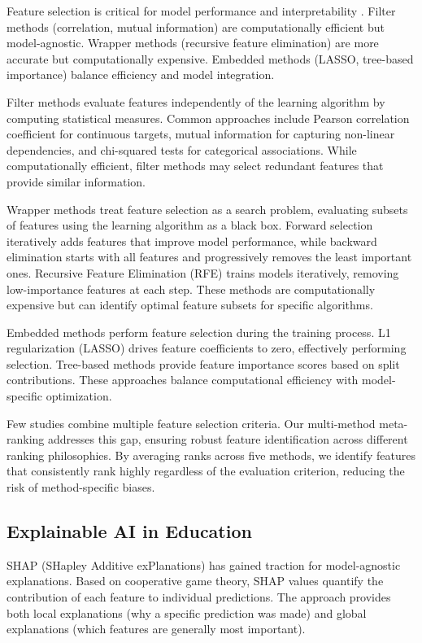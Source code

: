 \documentclass[journal]{IEEEtran}
\begin{document}
Feature selection is critical for model performance and interpretability \cite{guyon2003introduction}. Filter methods (correlation, mutual information) are computationally efficient but model-agnostic. Wrapper methods (recursive feature elimination) are more accurate but computationally expensive. Embedded methods (LASSO, tree-based importance) balance efficiency and model integration.

Filter methods evaluate features independently of the learning algorithm by computing statistical measures. Common approaches include Pearson correlation coefficient for continuous targets, mutual information for capturing non-linear dependencies, and chi-squared tests for categorical associations. While computationally efficient, filter methods may select redundant features that provide similar information.

Wrapper methods treat feature selection as a search problem, evaluating subsets of features using the learning algorithm as a black box. Forward selection iteratively adds features that improve model performance, while backward elimination starts with all features and progressively removes the least important ones. Recursive Feature Elimination (RFE) trains models iteratively, removing low-importance features at each step. These methods are computationally expensive but can identify optimal feature subsets for specific algorithms.

Embedded methods perform feature selection during the training process. L1 regularization (LASSO) drives feature coefficients to zero, effectively performing selection. Tree-based methods provide feature importance scores based on split contributions. These approaches balance computational efficiency with model-specific optimization.

Few studies combine multiple feature selection criteria. Our multi-method meta-ranking addresses this gap, ensuring robust feature identification across different ranking philosophies. By averaging ranks across five methods, we identify features that consistently rank highly regardless of the evaluation criterion, reducing the risk of method-specific biases.

\subsection{Explainable AI in Education}

SHAP (SHapley Additive exPlanations) \cite{lundberg2017unified} has gained traction for model-agnostic explanations. Based on cooperative game theory, SHAP values quantify the contribution of each feature to individual predictions. The approach provides both local explanations (why a specific prediction was made) and global explanations (which features are generally most important).
\end{document}
